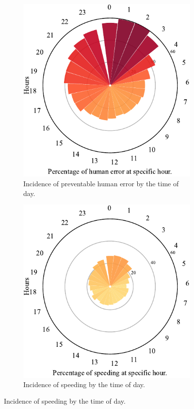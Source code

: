 \documentclass{article}
\theoremstyle{plain}
\theoremstyle{definition}
\theoremstyle{remark}
\begin{document}
\begin{figure}[ht]
	\vskip 0.2in
	\centering
		\begin{subfigure}[ht]{0.49\columnwidth}
			\includegraphics[width=\columnwidth]{plots/err-time-total}
			\caption{Incidence of preventable human error by the time of day.}
			\label{fig:err-time-overall}
		\end{subfigure}
		\hfill
		\begin{subfigure}[ht]{0.49\columnwidth}
			\includegraphics[width=\columnwidth]{plots/err-time-speeding}
			\caption{Incidence of speeding by the time of day.}
			\label{fig:err-time-speeding}
		\end{subfigure}


\end{figure}
\end{document}
